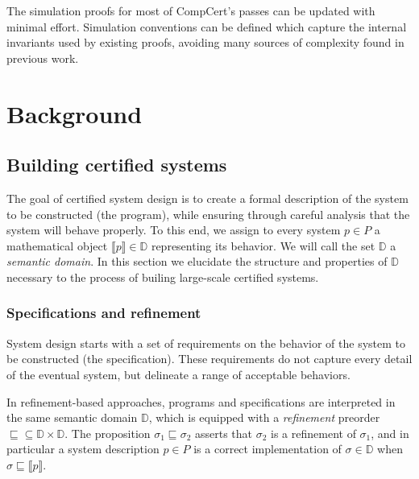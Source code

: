 \documentclass[draft,11pt]{report}
\newcommand{\refby}{\sqsubseteq} %
\begin{document}
The simulation proofs for
most of CompCert's passes
can be updated with minimal effort.
Simulation conventions can be defined
which capture the internal invariants
used by existing proofs,
avoiding many sources of complexity found
in previous work.






\chapter{Background} %

\section{Building certified systems} \label{sec:principles} %


The goal of certified system design is
to create a formal description of
the system to be constructed (the program),
while ensuring
through careful analysis
that the system
will behave properly.
To this end,
we assign
to every system $p \in P$
a mathematical object $\llbracket p \rrbracket \in \mathbb{D}$
representing its behavior.
We will call the set $\mathbb{D}$ a \emph{semantic domain}.
In this section we elucidate
the structure and properties of $\mathbb{D}$
necessary to the process of builing
large-scale certified systems.


\subsection{Specifications and refinement} %

System design starts with a set of requirements
on the behavior of the system to be constructed
(the specification).
These requirements do not capture every detail
of the eventual system,
but delineate a range of acceptable behaviors.

In refinement-based approaches,
programs and specifications are interpreted in the same
semantic domain $\mathbb{D}$,
which is equipped with a \emph{refinement} preorder
${\refby} \subseteq \mathbb{D} \times \mathbb{D}$.
The proposition $\sigma_1 \refby \sigma_2$
asserts that $\sigma_2$ is a refinement of $\sigma_1$,
and in particular a system description $p \in P$ is a correct implementation
of $\sigma \in \mathbb{D}$ when
$\sigma \refby \llbracket p \rrbracket$.
\end{document}
